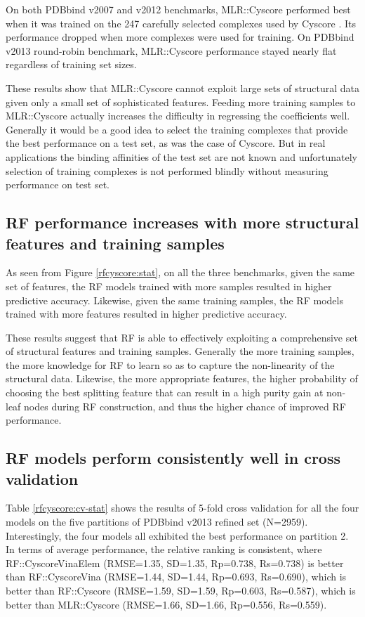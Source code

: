 On both PDBbind v2007 and v2012 benchmarks, MLR::Cyscore performed best when it was trained on the 247 carefully selected complexes used by Cyscore \citep{1372}. Its performance dropped when more complexes were used for training. On PDBbind v2013 round-robin benchmark, MLR::Cyscore performance stayed nearly flat regardless of training set sizes.

These results show that MLR::Cyscore cannot exploit large sets of structural data given only a small set of sophisticated features. Feeding more training samples to MLR::Cyscore actually increases the difficulty in regressing the coefficients well. Generally it would be a good idea to select the training complexes that provide the best performance on a test set, as was the case of Cyscore. But in real applications the binding affinities of the test set are not known and unfortunately selection of training complexes is not performed blindly without measuring performance on test set.

\subsection{RF performance increases with more structural features and training samples}

As seen from Figure \ref{rfcyscore:stat}, on all the three benchmarks, given the same set of features, the RF models trained with more samples resulted in higher predictive accuracy. Likewise, given the same training samples, the RF models trained with more features resulted in higher predictive accuracy.

These results suggest that RF is able to effectively exploiting a comprehensive set of structural features and training samples. Generally the more training samples, the more knowledge for RF to learn so as to capture the non-linearity of the structural data. Likewise, the more appropriate features, the higher probability of choosing the best splitting feature that can result in a high purity gain at non-leaf nodes during RF construction, and thus the higher chance of improved RF performance.

\subsection{RF models perform consistently well in cross validation}

Table \ref{rfcyscore:cv-stat} shows the results of 5-fold cross validation for all the four models on the five partitions of PDBbind v2013 refined set (N=2959). Interestingly, the four models all exhibited the best performance on partition 2. In terms of average performance, the relative ranking is consistent, where RF::CyscoreVinaElem (RMSE=1.35, SD=1.35, Rp=0.738, Rs=0.738) is better than RF::CyscoreVina (RMSE=1.44, SD=1.44, Rp=0.693, Rs=0.690), which is better than RF::Cyscore (RMSE=1.59, SD=1.59, Rp=0.603, Rs=0.587), which is better than MLR::Cyscore (RMSE=1.66, SD=1.66, Rp=0.556, Rs=0.559).

